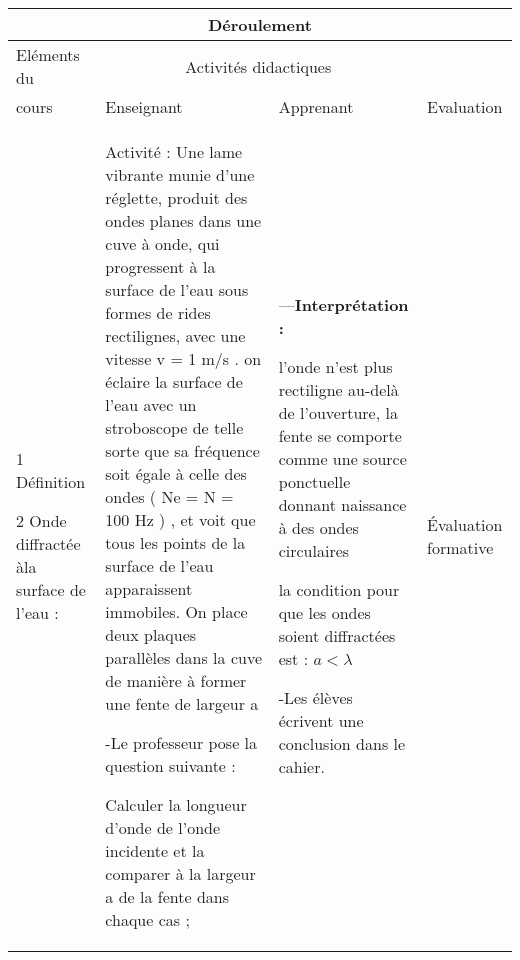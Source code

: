 \documentclass[12pt]{article}
\begin{document}

\begin{center}
	 \begin{tabular}{|p{}||p{}||p{}||p{}|}
\hline
\multicolumn{4}{|c|}{Déroulement}\\\hline
Eléments du & \multicolumn{2}{c||}{Activités didactiques} &  \\\cline{2-3}
cours & Enseignant & Apprenant & Evaluation\\\hline

\color{red}{IV Phénomène de diffraction:}

\vspace{0.5cm}
\color{blue}1
Définition

\vspace{0.5cm}
\color{blue}2 Onde diffractée àla surface de l’eau : 
				  &
Activité : 
Une lame vibrante munie d’une réglette, produit des ondes planes dans une cuve à onde, qui
progressent à la surface de l’eau sous formes de rides rectilignes, avec une vitesse v = 1 m/s
.
on éclaire la surface de l’eau avec un stroboscope de telle sorte que sa fréquence soit égale à celle
des ondes ( Ne = N = 100 Hz ) , et voit que tous les points de la surface de l’eau apparaissent
immobiles.
On place deux plaques parallèles dans la cuve de manière à former une fente de largeur a

-Le professeur pose la question suivante : 



\vspace{0.2cm}
Calculer la longueur
d’onde de l’onde
incidente et la comparer
à la largeur a de la fente
dans chaque cas ;

\vspace{0.2cm}



				  &

---\textbf{Interprétation : }

l'onde n'est plus rectiligne au-delà de l’ouverture, la fente se comporte comme
une source ponctuelle donnant naissance à des ondes circulaires

\vspace{0.2cm}

la condition pour que les ondes soient diffractées est : $a < \lambda$

-Les élèves écrivent une conclusion dans le cahier.
\vspace{0.5cm}

				  & 
	Évaluation formative\\\hline 
\end{tabular}
\end{center}
\end{document}
